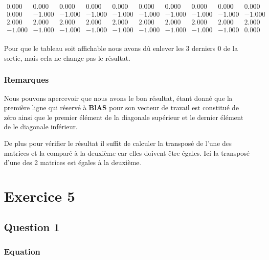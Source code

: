 \documentclass[11pt]{article}
\begin{document}
\begin{equation*}
  \begin{array}{rrrrrrrrrr}
    0.000 &	0.000 &	0.000 &	0.000 &
    0.000 &	0.000 &	0.000 &	0.000 &
    0.000 &	0.000 \\	
    0.000 &	-1.000 &	-1.000 &	-1.000 &
    -1.000 &	-1.000 &	-1.000 &	-1.000 &
    -1.000 &	-1.000 \\
    2.000 &	2.000 &	2.000 &	2.000 &
    2.000 &	2.000 &	2.000 &	2.000 &
    2.000 &	2.000 \\	
    -1.000 &	-1.000 &	-1.000 &	-1.000 &
    -1.000 &	-1.000 &	-1.000 &	-1.000 &
    -1.000 &	0.000 \\
  \end{array}
\end{equation*}

Pour que le tableau soit affichable nous avons dû enlever les 3
derniers 0 de la sortie, mais cela ne change pas le résultat.

\subsubsection{Remarques}

Nous pouvons apercevoir que nous avons le bon résultat, étant donné
que la première ligne qui réservé à \textbf{BlAS} pour son vecteur de
travail est constitué de zéro ainsi que le premier élément de la
diagonale supérieur et le dernier élément de le diagonale
inférieur.\newline

\vspace{5mm}

De plus pour vérifier le résultat il suffit de calculer la transposé
de l'une des matrices et la comparé à la deuxième car elles doivent
être égales. Ici la transposé d'une des 2 matrices est égales à la
deuxième.

\section{Exercice 5}

\subsection{Question 1}

\subsubsection{Equation}
\end{document}
